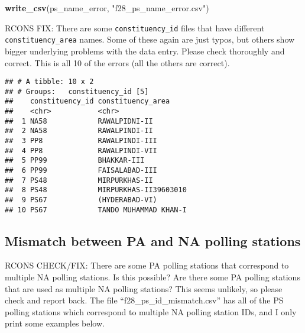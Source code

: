 \documentclass[]{article}
\newenvironment{Shaded}{\begin{snugshade}}{\end{snugshade}}
\newcommand{\DecValTok}[1]{\textcolor[rgb]{0.00,0.00,0.81}{#1}}
\newcommand{\KeywordTok}[1]{\textcolor[rgb]{0.13,0.29,0.53}{\textbf{#1}}}
\newcommand{\NormalTok}[1]{#1}
\newcommand{\OperatorTok}[1]{\textcolor[rgb]{0.81,0.36,0.00}{\textbf{#1}}}
\newcommand{\StringTok}[1]{\textcolor[rgb]{0.31,0.60,0.02}{#1}}
\begin{document}
\begin{Shaded}
\begin{Highlighting}[]
\KeywordTok{write_csv}\NormalTok{(ps_name_error, }\StringTok{"f28_ps_name_error.csv"}\NormalTok{)}
\end{Highlighting}
\end{Shaded}

RCONS FIX: There are some \texttt{constituency\_id} files that have
different \texttt{constituency\_area} names. Some of these again are
just typos, but others show bigger underlying problems with the data
entry. Please check thoroughly and correct. This is all 10 of the errors
(all the others are correct).

\begin{Shaded}
\end{Shaded}

\begin{verbatim}
## # A tibble: 10 x 2
## # Groups:   constituency_id [5]
##    constituency_id constituency_area    
##    <chr>           <chr>                
##  1 NA58            RAWALPIDNI-II        
##  2 NA58            RAWALPINDI-II        
##  3 PP8             RAWALPINDI-III       
##  4 PP8             RAWALPINDI-VII       
##  5 PP99            BHAKKAR-III          
##  6 PP99            FAISALABAD-III       
##  7 PS48            MIRPURKHAS-II        
##  8 PS48            MIRPURKHAS-II39603010
##  9 PS67            (HYDERABAD-VI)       
## 10 PS67            TANDO MUHAMMAD KHAN-I
\end{verbatim}

\hypertarget{mismatch-between-pa-and-na-polling-stations}{%
\subsection{Mismatch between PA and NA polling
stations}\label{mismatch-between-pa-and-na-polling-stations}}

RCONS CHECK/FIX: There are some PA polling stations that correspond to
multiple NA polling stations. Is this possible? Are there some PA
polling stations that are used as multiple NA polling stations? This
seems unlikely, so please check and report back. The file
``f28\_ps\_id\_mismatch.csv'' has all of the PS polling stations which
correspond to multiple NA polling station IDs, and I only print some
examples below.
\end{document}

